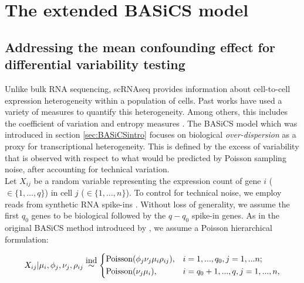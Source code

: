 
\section{The extended BASiCS model}
\subsection*{Addressing the mean confounding effect for differential variability testing}


Unlike bulk RNA sequencing, scRNAseq provides information about cell-to-cell expression heterogeneity within a population of cells. Past works have used a variety of measures to quantify this heterogeneity. Among others, this includes the coefficient of variation \citep[CV,][]{Brennecke2013} and entropy measures \citep{Richard2016}. The BASiCS model \citep{Vallejos2015, Vallejos2016a} which was introduced in section \ref{sec:BASiCSintro} focuses on biological {\it over-dispersion} as a proxy for transcriptional heterogeneity. This is defined by the excess of variability that is observed with respect to what would be predicted by Poisson sampling noise, after accounting for technical variation. \\ 

Let $X_{ij}$ be a random variable representing the expression count of gene $i$ ($ \in \{1, \ldots, q\}$) in cell $j$ ($\in \{ 1, \ldots ,n\}$). 
To control for technical noise, we employ reads from synthetic RNA spike-ins \citep[e.g.~those introduced by][]{Jiang2011}. Without loss of generality, we assume the first $q_0$ genes to be biological followed by the $q-q_0$ spike-in genes. As in the original BASiCS method introduced by \cite{Vallejos2015}, we assume a Poisson hierarchical formulation: 

\begin{equation} \label{eq::PoissonBASiCS}
 X_{ij}|\mu_i,\phi_j,\nu_j,\rho_{ij} \stackrel{\mbox{ind}}{\sim}
 \left\lbrace
  \begin{aligned}
    &\textnormal{Poisson}(\phi_j\nu_j\mu_i\rho_{ij}), && i=1,...,q_0,j=1,...n;  \\ 
    &\textnormal{Poisson}(\nu_j\mu_i), && i=q_0+1,...,q,j=1,...,n,    	    
  \end{aligned}
\right.
\end{equation} 

